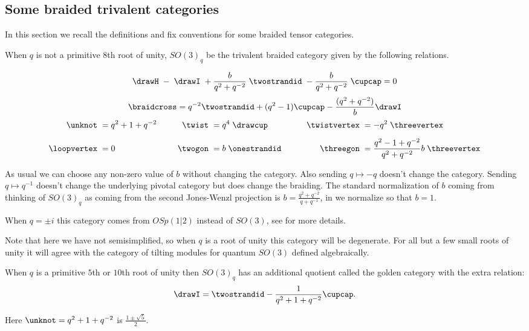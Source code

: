 \documentclass[12pt]{amsart}
\begin{document}
\subsection{Some braided trivalent categories}

In this section we recall the definitions and fix conventions for some braided tensor categories.

\begin{definition}
When $q$ is not a primitive $8$th root of unity, $SO(3)_q$ be the trivalent braided category given by the following relations.

$$  \drawH \; - \; \drawI \; + \frac{b}{q^2+q^{-2}}\; \twostrandid \; -  \frac{b}{q^2+q^{-2}}\; \cupcap = 0$$
$$\braidcross  =  q^{-2} \twostrandid + (q^2 - 1) \cupcap - \frac{(q^2+q^{-2})}{b} \drawI$$
\begin{align*}
    \unknot\; &= q^2+1+q^{-2}&\qquad
      \twist\; &= q^4 \;\drawcup&\qquad
        \twistvertex\; &= -q^2\;\threevertex\\[5pt]
    \loopvertex\;&=0&
      \twogon\;&= b\;\onestrandid&
        \threegon\; &= \frac{q^2-1+q^{-2}}{q^2+q^{-2}} b\;\threevertex
\end{align*}
\end{definition}

As usual we can choose any non-zero value of $b$ without changing the category.  Also sending $q \mapsto -q$ doesn't change the category.  Sending $q \mapsto q^{-1}$ doesn't change the underlying pivotal category but does change the braiding.  The standard normalization of $b$ coming from thinking of $SO(3)_q$ as coming from the second Jones-Wenzl projection is $b = \frac{q^2+q^{-2}}{q+q^{-1}}$, in \cite{trivalent} we normalize so that $b=1$.

When $q=\pm i$ this category comes from $OSp(1|2)$ instead of $SO(3)$, see \cite{trivalent} for more details.

Note that here we have not semisimplified, so when $q$ is a root of unity this category will be degenerate.  For all but a few small roots of unity it will agree with the category of tilting modules for quantum $SO(3)$ defined algebraically.

\begin{definition}
When $q$ is a primitive $5$th or $10$th root of unity then $SO(3)_q$ has an additional quotient called the golden category with the extra relation:
$$\drawI = \twostrandid -\frac{1}{q^2+1+q^{-2}} \cupcap.$$

Here $\unknot = q^2+1+q^{-2}$ is $\frac{1\pm \sqrt{5}}{2}$.
\end{definition}
\end{document}
